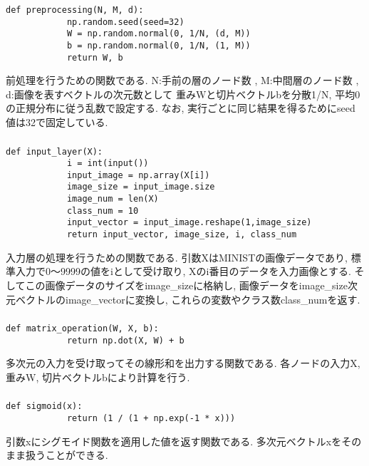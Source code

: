 \documentclass[a4j, titlepage]{jarticle}
\begin{document}
    \subsubsection*{}
        \begin{lstlisting}[caption=前処理,label=fuga]
        def preprocessing(N, M, d):
            np.random.seed(seed=32)
            W = np.random.normal(0, 1/N, (d, M))
            b = np.random.normal(0, 1/N, (1, M))
            return W, b
        \end{lstlisting}
        前処理を行うための関数である.
        N:手前の層のノード数 , M:中間層のノード数 , d:画像を表すベクトルの次元数として
        重みWと切片ベクトルbを分散1/N, 平均0の正規分布に従う乱数で設定する.
        なお, 実行ごとに同じ結果を得るためにseed値は32で固定している.

    \subsubsection*{}
        \begin{lstlisting}[caption=入力層の処理,label=fuga]
        def input_layer(X):
            i = int(input())
            input_image = np.array(X[i])
            image_size = input_image.size
            image_num = len(X)
            class_num = 10
            input_vector = input_image.reshape(1,image_size)
            return input_vector, image_size, i, class_num
        \end{lstlisting}
        入力層の処理を行うための関数である.
        引数XはMINISTの画像データであり, 標準入力で0～9999の値をiとして受け取り,
        Xのi番目のデータを入力画像とする.
        そしてこの画像データのサイズをimage\_sizeに格納し, 画像データをimage\_size次元ベクトルのimage\_vectorに変換し, これらの変数やクラス数class\_numを返す.

    \subsubsection*{}
        \begin{lstlisting}[caption=線形和の計算,label=fuga]
        def matrix_operation(W, X, b):
            return np.dot(X, W) + b
        \end{lstlisting}
        多次元の入力を受け取ってその線形和を出力する関数である.
        各ノードの入力X, 重みW, 切片ベクトルbにより計算を行う.

    \subsubsection*{}
        \begin{lstlisting}[caption=シグモイド関数,label=fuga]
        def sigmoid(x):
            return (1 / (1 + np.exp(-1 * x)))
        \end{lstlisting}
        引数xにシグモイド関数を適用した値を返す関数である.
        多次元ベクトルxをそのまま扱うことができる.
\end{document}
